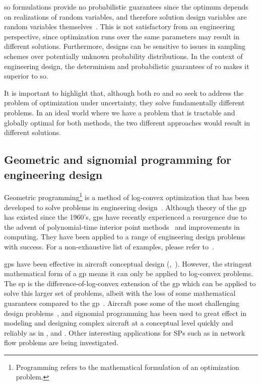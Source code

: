 \gls{so} formulations provide no probabilistic guarantees
since the optimum depends on realizations of random variables, and therefore solution
design variables are random variables themselves~\cite{Shmoys2004}.
This is not satisfactory from an engineering perspective, since
optimization runs over the same parameters may result in different
solutions. Furthermore, designs
can be sensitive to issues in sampling schemes over potentially unknown
probability distributions. In the context of engineering design, the determinism
and probabilistic guarantees of \gls{ro} makes
it superior to \gls{so}.

It is important to highlight that,
although both \gls{ro} and \gls{so} seek to address the problem
of optimization under uncertainty, they solve fundamentally different problems. In an ideal world where
we have a problem that is tractable and globally optimal for both methods, the two different
approaches would result in different solutions.

\subsection{Geometric and signomial programming for engineering design}

Geometric programming\footnote{Programming refers to the mathematical formulation of an optimization problem.}
is a method of log-convex optimization that has been developed
to solve problems in engineering design~\cite{Duffin1967}. Although theory of the \gls{gp} has existed since
the 1960's, \gls{gp}s have recently experienced a resurgence due to the advent of polynomial-time
interior point methods~\cite{Nesterov1994} and improvements in computing. They have been
applied to a range of engineering design problems with success. For a non-exhaustive list of examples,
please refer to~\cite{Boyd2007}.

\gls{gp}s have been effective in aircraft conceptual design
(\cite{Hoburg2013},~\cite{Burton2017}).
However, the stringent mathematical form of a \gls{gp} means it can only be applied to log-convex problems.
The \gls{sp} is the difference-of-log-convex extension of the \gls{gp} which can be applied to
solve this larger set of problems, albeit with the loss of some mathematical guarantees compared to the \gls{gp}~\cite{Kirschen2018}.
Aircraft pose some of the most challenging design problems~\cite{York2018}, and signomial programming
has been used to great effect in modeling and designing complex aircraft at a conceptual level quickly
and reliably as in \cite{York2018}, \cite{Kirschen2018} and \cite{Kirschen2016}.
Other interesting applications for SPs such as in network flow problems are being investigated.

